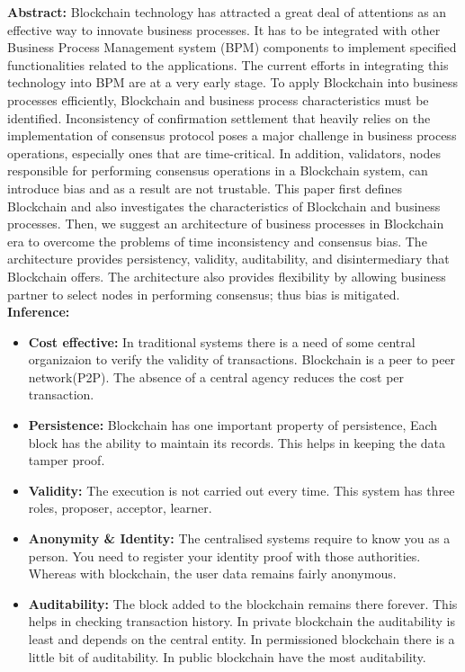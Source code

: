 \documentclass[oneside, 12pt]{book}
\begin{document}
\begin{enumerate}
					\textbf{Abstract:} Blockchain technology has attracted a great deal of attentions as an effective way to innovate business processes. It has to be integrated with other Business Process Management system (BPM) components to implement specified functionalities related to the applications. The current efforts in integrating this technology into BPM are at a very early stage. To apply Blockchain into business processes efficiently, Blockchain and business process characteristics must be identified. Inconsistency of confirmation settlement that heavily relies on the implementation of consensus protocol poses a major challenge in business process operations, especially ones that are time-critical. In addition, validators, nodes responsible for performing consensus operations in a Blockchain system, can introduce bias and as a result are not trustable. This paper first defines Blockchain and also investigates the characteristics of Blockchain and business processes. Then, we suggest an architecture of business processes in Blockchain era to overcome the problems of time inconsistency and consensus bias. The architecture provides persistency, validity, auditability, and disintermediary that Blockchain offers. The architecture also provides flexibility by allowing business partner to select nodes in performing consensus; thus bias is mitigated.\\
					\textbf{Inference:}
					\begin{itemize}
						\item\textbf{Cost effective:} In traditional systems there is a need of some central organizaion to verify the validity of transactions. Blockchain is a peer to peer network(P2P). The absence of a central agency reduces the cost per transaction.
						\item\textbf{Persistence:} Blockchain has one important property of persistence, Each block has the ability to maintain its records. This helps in keeping the data tamper proof.
						\item\textbf{Validity:} The execution is not carried out every time. This system has three roles, proposer, acceptor, learner.
						\item\textbf{Anonymity \& Identity:} The centralised systems require to know you as a person. You need to register your identity proof with those authorities. Whereas with blockchain, the user data remains fairly anonymous.
						\item\textbf{Auditability:} The block added to the blockchain remains there forever. This helps in checking transaction history. In private blockchain the auditability is least and depends on the central entity. In permissioned blockchain there is a little bit of auditability. In public blockchain have the most auditability.

\end{itemize}
\end{enumerate}
\end{document}
